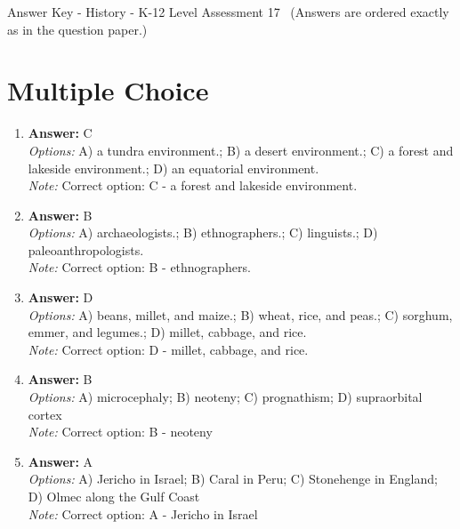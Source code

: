 \documentclass[12pt]{article}
\begin{document}
\begin{center}
Answer Key - History - K-12 Level Assessment 17 \
\small (Answers are ordered exactly as in the question paper.)
\end{center}

\section*{Multiple Choice}
\begin{enumerate}[label=\arabic*.]
\item \textbf{Answer:} C
\\ \textit{Options:} A) a tundra environment.; B) a desert environment.; C) a forest and lakeside environment.; D) an equatorial environment.
\\ \textit{Note:} Correct option: C - a forest and lakeside environment.
\item \textbf{Answer:} B
\\ \textit{Options:} A) archaeologists.; B) ethnographers.; C) linguists.; D) paleoanthropologists.
\\ \textit{Note:} Correct option: B - ethnographers.
\item \textbf{Answer:} D
\\ \textit{Options:} A) beans, millet, and maize.; B) wheat, rice, and peas.; C) sorghum, emmer, and legumes.; D) millet, cabbage, and rice.
\\ \textit{Note:} Correct option: D - millet, cabbage, and rice.
\item \textbf{Answer:} B
\\ \textit{Options:} A) microcephaly; B) neoteny; C) prognathism; D) supraorbital cortex
\\ \textit{Note:} Correct option: B - neoteny
\item \textbf{Answer:} A
\\ \textit{Options:} A) Jericho in Israel; B) Caral in Peru; C) Stonehenge in England; D) Olmec along the Gulf Coast
\\ \textit{Note:} Correct option: A - Jericho in Israel
\end{enumerate}
\end{document}
